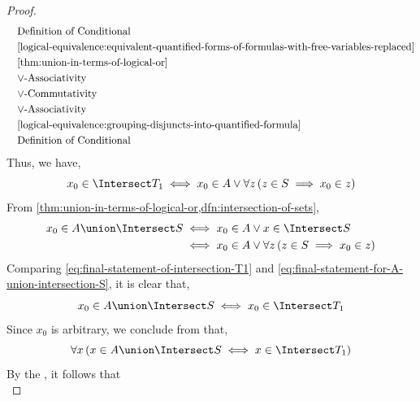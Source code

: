 \begin{proof}
\begin{equation*}
\begin{aligned}
            &\quad \text{Definition of Conditional}\\
            &\quad \text{\cref{logical-equivalence:equivalent-quantified-forms-of-formulas-with-free-variables-replaced}}\\
            &\quad \text{\cref{thm:union-in-terms-of-logical-or}}\\
            &\quad \text{\( \lor \)-Associativity}\\
            &\quad \text{\( \lor \)-Commutativity}\\
            &\quad \text{\( \lor \)-Associativity}\\
            &\quad \text{\cref{logical-equivalence:grouping-disjuncts-into-quantified-formula}}\\
            &\quad \text{Definition of Conditional}\\
        \end{aligned}
    \end{equation*}
    Thus, we have,
    \begin{equation}
        \label{eq:final-statement-of-intersection-T1}
        x_{0} \in \Intersect T_{1}
        \iff
        x_{0} \in A \lor \forall z \, \mleft( z \in S \implies x_{0} \in z \mright)
    \end{equation}
    From \cref{thm:union-in-terms-of-logical-or,dfn:intersection-of-sets},
    \begin{align}
        \label{eq:final-statement-for-A-union-intersection-S}
        x_{0} \in A \union \Intersect S
        &\iff
        x_{0} \in A \lor x \in \Intersect S \notag \\
        &\iff
        x_{0} \in A \lor \forall z \, \mleft( z \in S \implies x_{0} \in z \mright)
    \end{align}
    Comparing \eqref{eq:final-statement-of-intersection-T1} and \eqref{eq:final-statement-for-A-union-intersection-S},
    it is clear that,
    \begin{equation*}
        x_{0} \in A \union \Intersect S \iff x_{0} \in \Intersect T_{1}
    \end{equation*}
    Since \( x_{0} \) is arbitrary, we conclude from  that,
    \begin{equation*}
        \forall x \, \mleft( x \in A \union \Intersect S \iff x \in \Intersect T_{1} \mright)
    \end{equation*}
    By the , it follows that
    \begin{equation*}

\end{equation*}
\end{proof}
